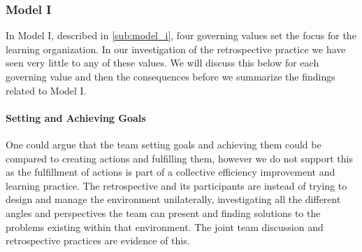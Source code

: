 \subsubsection{Model I}
In Model I, described in \autoref{sub:model_i}, four governing values set the focus for the learning organization. In our investigation of the retrospective practice we have seen very little to any of these values. We will discuss this below for each governing value and then the consequences before we summarize the findings related to Model I.  

\paragraph{Setting and  Achieving Goals}
One could argue that the team setting goals and achieving them could be compared to creating actions and fulfilling them, however we do not support this as the fulfillment of actions is part of a collective efficiency improvement and learning practice. The retrospective and its participants are instead of trying to design and manage the environment unilaterally, investigating all the different angles and perspectives the team can present and finding solutions to the problems existing within that environment. The joint team discussion and retrospective practices are evidence of this. 